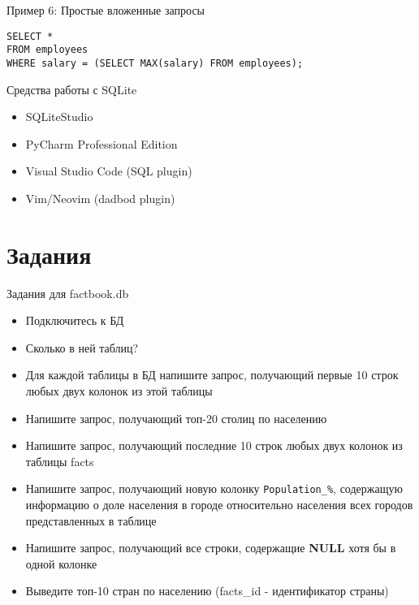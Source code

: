 \documentclass{beamer}
\begin{document}
\begin{frame}[fragile]{Пример 6: Простые вложенные запросы}
	\begin{verbatim}
SELECT *
FROM employees
WHERE salary = (SELECT MAX(salary) FROM employees);
    \end{verbatim}
\end{frame}

\begin{frame}[fragile]{Средства работы с SQLite}
	\begin{itemize}
		\item SQLiteStudio
		\item PyCharm Professional Edition
		\item Visual Studio Code (SQL plugin)
		\item Vim/Neovim (dadbod plugin)
	\end{itemize}
\end{frame}

\section{Задания}

\begin{frame}[fragile]{Задания для factbook.db}
	\begin{itemize}
		\item Подключитесь к БД
		\item Сколько в ней таблиц?
		\item Для каждой таблицы в БД напишите запрос, получающий первые 10 строк любых двух колонок из этой таблицы
		\item Напишите запрос, получающий топ-20 столиц по населению
		\item Напишите запрос, получающий последние 10 строк любых двух колонок из таблицы facts
		\item Напишите запрос, получающий новую колонку \texttt{Population\_\%}, содержащую информацию о доле населения в городе относительно населения всех городов представленных в таблице
		\item Напишите запрос, получающий все строки, содержащие \textbf{NULL} хотя бы в одной колонке
		\item Выведите топ-10 стран по населению (facts\_id - идентификатор страны)
	\end{itemize}
\end{frame}
\end{document}
